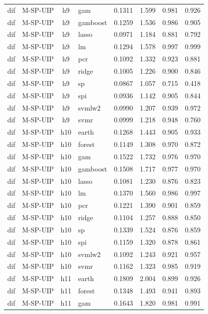 \begin{ThreePartTable}
\begin{longtable}[t]{llclcccc}
dif & M-SP-UIP & h9 & gam & 0.1311 & 1.599 & 0.981 & 0.926\\
dif & M-SP-UIP & h9 & gamboost & 0.1259 & 1.536 & 0.986 & 0.905\\
dif & M-SP-UIP & h9 & lasso & 0.0971 & 1.184 & 0.881 & 0.792\\
dif & M-SP-UIP & h9 & lm & 0.1294 & 1.578 & 0.997 & 0.999\\
dif & M-SP-UIP & h9 & pcr & 0.1092 & 1.332 & 0.923 & 0.881\\
dif & M-SP-UIP & h9 & ridge & 0.1005 & 1.226 & 0.900 & 0.846\\
dif & M-SP-UIP & h9 & sp & 0.0867 & 1.057 & 0.715 & 0.418\\
dif & M-SP-UIP & h9 & spi & 0.0936 & 1.142 & 0.905 & 0.844\\
dif & M-SP-UIP & h9 & svmlw2 & 0.0990 & 1.207 & 0.939 & 0.972\\
dif & M-SP-UIP & h9 & svmr & 0.0999 & 1.218 & 0.948 & 0.760\\
\addlinespace
dif & M-SP-UIP & h10 & earth & 0.1268 & 1.443 & 0.905 & 0.933\\
dif & M-SP-UIP & h10 & forest & 0.1149 & 1.308 & 0.970 & 0.872\\
dif & M-SP-UIP & h10 & gam & 0.1522 & 1.732 & 0.976 & 0.970\\
dif & M-SP-UIP & h10 & gamboost & 0.1508 & 1.717 & 0.977 & 0.970\\
dif & M-SP-UIP & h10 & lasso & 0.1081 & 1.230 & 0.876 & 0.823\\
dif & M-SP-UIP & h10 & lm & 0.1370 & 1.560 & 0.986 & 0.997\\
dif & M-SP-UIP & h10 & pcr & 0.1221 & 1.390 & 0.901 & 0.859\\
dif & M-SP-UIP & h10 & ridge & 0.1104 & 1.257 & 0.888 & 0.850\\
dif & M-SP-UIP & h10 & sp & 0.1339 & 1.524 & 0.876 & 0.859\\
dif & M-SP-UIP & h10 & spi & 0.1159 & 1.320 & 0.878 & 0.861\\
dif & M-SP-UIP & h10 & svmlw2 & 0.1092 & 1.243 & 0.921 & 0.957\\
dif & M-SP-UIP & h10 & svmr & 0.1162 & 1.323 & 0.985 & 0.919\\
\addlinespace
dif & M-SP-UIP & h11 & earth & 0.1809 & 2.004 & 0.899 & 0.926\\
dif & M-SP-UIP & h11 & forest & 0.1348 & 1.493 & 0.941 & 0.893\\
dif & M-SP-UIP & h11 & gam & 0.1643 & 1.820 & 0.981 & 0.991\\

\end{longtable}
\end{ThreePartTable}
